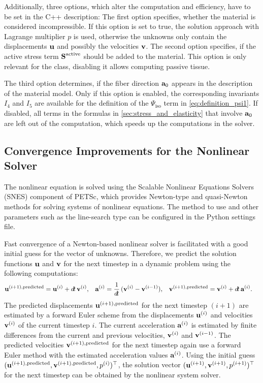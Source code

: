 Additionally, three options, which alter the computation and efficiency, have to be set in the C++ description: The first option specifies, whether the material is considered incompressible. If this option is set to true, the solution approach with Lagrange multiplier $p$ is used, otherwise the unknowns only contain the displacements $\textbf{u}$ and possibly the velocities $\textbf{v}$. The second option specifies, if the active stress term $\textbf{S}^\text{active}$ should be added to the material. This option is only relevant for the  class, disabling it allows computing passive tissue.

The third option determines, if the fiber direction $\textbf{a}_0$ appears in the description of the material model. Only if this option is enabled, the corresponding invariants $I_4$ and $I_5$ are available for the definition of the $\Psi_\text{iso}$ term in \cref{eq:definition_psi1}. If disabled, all terms in the formulas in \cref{sec:stress_and_elasticity} that involve $\textbf{a}_0$ are left out of the computation, which speeds up the computations in the solver.

\subsection{Convergence Improvements for the Nonlinear Solver}\label{sec:convergence_improvements_for_the_nonlinear_solver}

The nonlinear equation is solved using the Scalable Nonlinear Equations Solvers (SNES) component of PETSc, which provides Newton-type and quasi-Newton methods for solving systems of nonlinear equations. The method to use and other parameters such as the line-search type can be configured in the Python settings file.

Fast convergence of a Newton-based nonlinear solver is facilitated with a good initial guess for the vector of unknowns. Therefore, we predict the solution functions $\textbf{u}$ and $\textbf{v}$ for the next timestep in a dynamic problem using the following computations:
\begin{align*}
  \bfu^{(i+1),\text{predicted}} &= \bfu^{(i)} + \dt\,\bfv^{(i)}, & 
  \bfa^{(i)} &= \dfrac1{\dt}(\bfv^{(i)} - \bfv^{(i-1)}), & 
  \bfv^{(i+1),\text{predicted}} &= \bfv^{(i)} + \dt\,\bfa^{(i)}.
\end{align*}
%
The predicted displacements $\textbf{u}^{(i+1),\text{predicted}}$ for the next timestep $(i+1)$ are estimated by a forward Euler scheme from the displacements $\textbf{u}^{(i)}$ and velocities $\textbf{v}^{(i)}$ of the current timestep $i$. The current acceleration $\textbf{a}^{(i)}$ is estimated by finite differences from the current and previous velocities, $\textbf{v}^{(i)}$ and $\textbf{v}^{(i-1)}$. The predicted velocities $\textbf{v}^{(i+1),\text{predicted}}$ for the next timestep again use a forward Euler method with the estimated acceleration values $\textbf{a}^{(i)}$.
Using the initial guess $(\textbf{u}^{(i+1),\text{predicted}},\textbf{v}^{(i+1),\text{predicted}},p^{(i)})^\top$, the solution vector $(\textbf{u}^{(i+1)},\textbf{v}^{(i+1)},p^{(i+1)})^\top$  for the next timestep can be obtained by the nonlinear system solver.

